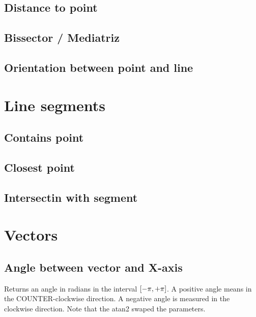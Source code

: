 \subsection{Distance to point}

\subsection{Bissector / Mediatriz}

\subsection{Orientation between point and line}

\section{Line segments}

\subsection{Contains point}

\subsection{Closest point}

\subsection{Intersectin with segment}

\section{Vectors}

\subsection{Angle between vector and X-axis}
Returns an angle in radians in the interval $\interval{-\pi}{+\pi}$. A positive angle means in the COUNTER-clockwise direction. A negative angle is measured in the clockwise direction. Note that the atan2 swaped the parameters.

